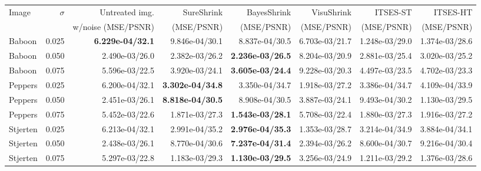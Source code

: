   
\begin{tabular}{l|r|rrrrrr}
	\toprule
	Image &  $\sigma$ &  Untreated img.  &      SureShrink &   BayesShrink &    VisuShrink &  ITSES-ST &  ITSES-HT \\
	&&w/noise (MSE/PSNR)&(MSE/PSNR)&(MSE/PSNR)&(MSE/PSNR)&(MSE/PSNR)&(MSE/PSNR)\\
\midrule
  Baboon &     0.025 & \textbf{6.229e-04/32.1}  &          9.846e-04/30.1 & 8.837e-04/30.5& 6.703e-03/21.7 & 1.248e-03/29.0 & 1.374e-03/28.6 \\
  Baboon &     0.050 & 2.490e-03/26.0 &          2.382e-03/26.2 & \textbf{2.236e-03/26.5} & 8.204e-03/20.9 & 2.881e-03/25.4 & 3.020e-03/25.2 \\
  Baboon &     0.075 & 5.596e-03/22.5 &          3.920e-03/24.1 & \textbf{3.605e-03/24.4} & 9.228e-03/20.3 & 4.497e-03/23.5 & 4.702e-03/23.3 \\
 Peppers &     0.025 & 6.200e-04/32.1 & \textbf{3.302e-04/34.8} &          3.350e-04/34.7 & 1.918e-03/27.2 & 3.386e-04/34.7 & 4.109e-04/33.9 \\
 Peppers &     0.050 & 2.451e-03/26.1 & \textbf{8.818e-04/30.5} &          8.908e-04/30.5 & 3.887e-03/24.1 & 9.493e-04/30.2 & 1.130e-03/29.5 \\
 Peppers &     0.075 & 5.452e-03/22.6 &          1.871e-03/27.3 & \textbf{1.543e-03/28.1} & 5.708e-03/22.4 & 1.880e-03/27.3 & 1.916e-03/27.2 \\
Stjerten &     0.025 & 6.213e-04/32.1 &          2.991e-04/35.2 & \textbf{2.976e-04/35.3} & 1.353e-03/28.7 & 3.214e-04/34.9 & 3.884e-04/34.1 \\
Stjerten &     0.050 & 2.438e-03/26.1 &          8.770e-04/30.6 & \textbf{7.237e-04/31.4} & 2.394e-03/26.2 & 8.600e-04/30.7 & 9.216e-04/30.4 \\
Stjerten &     0.075 & 5.297e-03/22.8 &          1.183e-03/29.3 & \textbf{1.130e-03/29.5} & 3.256e-03/24.9 & 1.211e-03/29.2 & 1.376e-03/28.6 \\
\bottomrule
\end{tabular}
